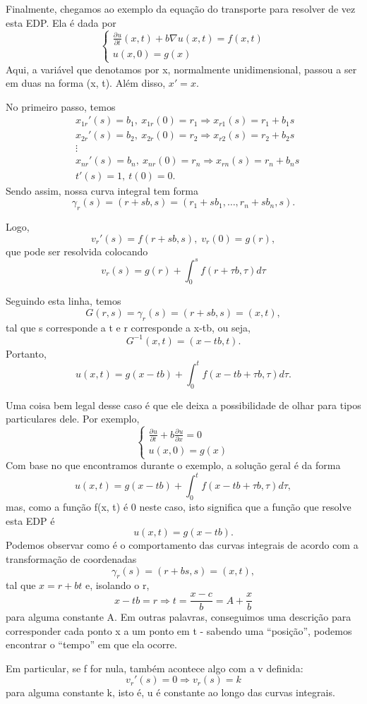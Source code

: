 \documentclass[../pde_notes.tex]{subfiles}
\begin{document}
\begin{example}
	Finalmente, chegamos ao exemplo da equação do transporte para resolver de vez esta EDP. Ela é dada por
	\[
		\left\{\begin{array}{ll}
			\frac{\partial^{}u}{\partial t^{}}(x, t) + b \nabla u(x, t) = f(x, t) \\
			u(x, 0) = g(x)
		\end{array}\right.
	\]
	Aqui, a variável que denotamos por x, normalmente unidimensional, passou a ser em duas na forma (x, t). Além disso, \(x'=x\).

	No primeiro passo, temos
	\begin{align*}
		 & x_{1r}'(s) = b_1, \: x_{1r}(0) = r_{1} \Rightarrow x_{r1}(s) = r_{1}+b_{1}s \\
		 & x_{2r}'(s) = b_2, \: x_{2r}(0) = r_{2} \Rightarrow x_{r2}(s) = r_{2}+b_{2}s \\
		 & \vdots                                                                      \\
		 & x_{nr}'(s) = b_n, \: x_{nr}(0) = r_{n} \Rightarrow x_{rn}(s) = r_{n}+b_{n}s \\
		 & t'(s) = 1, \: t(0) = 0.
	\end{align*}
	Sendo assim, nossa curva integral tem forma
	\[
		\gamma_{r}(s) = (r+sb, s) = (r_{1} + sb_{1}, \dotsc , r_{n}+sb_{n}, s).
	\]

	Logo,
	\[
		v_{r}'(s) = f(r+sb, s),\; v_{r}(0) = g(r),
	\]
	que pode ser resolvida colocando
	\[
		v_{r}(s) = g(r) + \int_{0}^{s}f(r+\tau b, \tau )d\tau
	\]

	Seguindo esta linha, temos
	\[
		G(r, s) = \gamma_{r}(s) = (r + sb, s) = (x, t),
	\]
	tal que s corresponde a t e r corresponde a x-tb, ou seja,
	\[
		G^{-1}(x, t) = (x-tb, t).
	\]
	Portanto,
	\[
		u(x, t) = g(x-tb) + \int_{0}^{t}f(x-tb + \tau b, \tau )d\tau .
	\]

	Uma coisa bem legal desse caso é que ele deixa a possibilidade de olhar para tipos particulares dele. Por exemplo,
	\[
		\left\{\begin{array}{ll}
			\frac{\partial^{}u}{\partial t^{}} + b \frac{\partial^{}u}{\partial x^{}} = 0 \\
			u(x, 0) = g(x)
		\end{array}\right.
	\]
	Com base no que encontramos durante o exemplo, a solução geral é da forma
	\[
		u(x, t) = g(x-tb) + \int_{0}^{t}f(x-tb + \tau b, \tau )d\tau,
	\]
	mas, como a função f(x, t) é 0 neste caso, isto significa que a função que resolve esta EDP é
	\[
		u(x, t) = g(x-tb).
	\]
	Podemos observar como é o comportamento das curvas integrais de acordo com a transformação de coordenadas
	\[
		\gamma_{r}(s) = (r+bs, s) = (x, t),
	\]
	tal que \(x = r + bt\) e, isolando o r,
	\[
		x-tb = r \Rightarrow t = \frac{x-c}{b} = A+\frac{x}{b}
	\]
	para alguma constante A. Em outras palavras, conseguimos uma descrição para corresponder cada ponto x a um ponto em t - sabendo uma ``posição'', podemos encontrar o ``tempo'' em que ela ocorre.

	Em particular, se f for nula, também acontece algo com a v definida:
	\[
		v_{r}'(s) = 0 \Rightarrow v_{r}(s) = k
	\]
	para alguma constante k, isto é, u é constante ao longo das curvas integrais.
\end{example}
\end{document}
